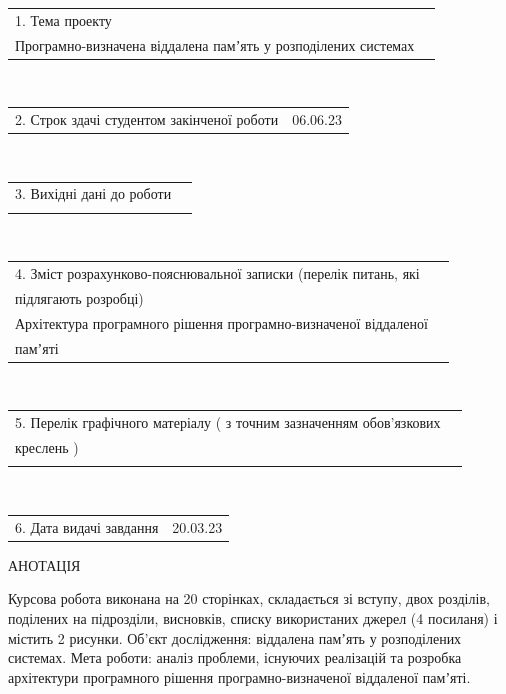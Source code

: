 \documentclass[14pt]{article}
\begin{document}
\fontsize{14}{17}\selectfont
\noindent
\begin{tabularx}{\textwidth}{l X}
    1. Тема проекту\\
    Програмно-визначена віддалена памʼять у розподілених системах\\
    \hline
\end{tabularx}
\\
\begin{tabularx}{\textwidth}{l X}
2. Строк здачі студентом закінченої роботи & 06.06.23\\
\cline{2-2}
\end{tabularx}
\\
\begin{tabularx}{\textwidth}{l X}
    3. Вихідні дані до роботи\\
    \\
    \hline
\end{tabularx}
\\
\begin{tabularx}{\textwidth}{l X}
    4. Зміст розрахунково-пояснювальної записки (перелік питань, які\\підлягають розробці)\\
    Архітектура програмного рішення програмно-визначеної віддаленої\\памʼяті\\
\end{tabularx}
\\
\begin{tabularx}{\textwidth}{l X}
    5.  Перелік графічного матеріалу ( з точним зазначенням обов’язкових\\ креслень )\\
    \\
    \hline
\end{tabularx}
\\
\begin{tabularx}{\textwidth}{l X}
    6. Дата видачі завдання & 20.03.23\\
\cline{2-2}
\end{tabularx}

\thispagestyle{empty}

\pagebreak

\begin{center}
АНОТАЦІЯ\\
\end{center}


\sloppy
Курсова робота виконана на 20 сторінках,  складається зі вступу, двох розділів, поділених на підрозділи, висновків, списку використаних джерел (4 посиланя) і містить 2 рисунки. Об’єкт дослідження: віддалена памʼять у розподілених системах. Мета роботи: аналіз проблеми, існуючих реалізацій та розробка архітектури програмного рішення програмно-визначеної віддаленої памʼяті.
\end{document}

